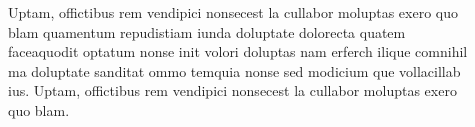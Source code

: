 \documentclass[final]{beamer}
\newlength{\sepwid}
\newlength{\onecolwid}
\begin{document}
\begin{frame}[t]
\begin{columns}[t]
\begin{column}{\onecolwid}
         \end{column}
                  
                  
                  
         \begin{column}{\sepwid}  \end{column}
         
         
         
         
         \begin{column}{\onecolwid} %
         
         \begin{block}{\vspace*{2.7cm}}
          Uptam, offictibus rem vendipici nonsecest la cullabor moluptas exero quo blam quamentum repudistiam iunda doluptate dolorecta quatem faceaquodit optatum nonse init volori doluptas nam erferch ilique comnihil ma doluptate sanditat ommo temquia nonse sed modicium que vollacillab ius. Uptam, offictibus rem vendipici nonsecest la cullabor moluptas exero quo blam.
          \end{block}
          
          \begin{block}{ }
				\begin{figure}
                	\vspace*{-1cm}
				\end{figure}
				\begin{figure}
				\end{figure}
                
                \begin{multicols}{2}
                \begin{figure}
                	\vspace*{-0.95cm}
				\end{figure}
                \begin{figure}
                	\vspace*{-0.95cm}
				\end{figure}
                \end{multicols}
                
                \begin{figure}
				\end{figure}
                

\end{block}
\end{column}
\end{columns}
\end{frame}
\end{document}
